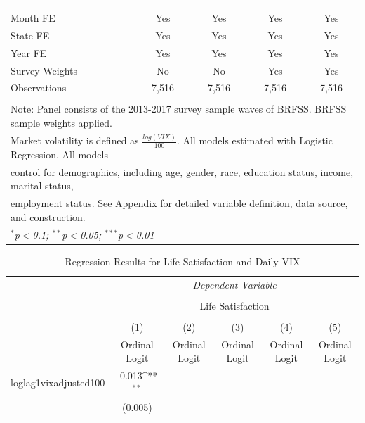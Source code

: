 \documentclass[11pt,a4paper,oldfontcommands]{memoir}
\begin{document}
{\begin{footnotesize}
\begin{footnotesize}
\begin{longtable}{l*{4}{c}}
\hline \\[-1.8ex] 
Month FE  & Yes & Yes & Yes & Yes \\ 
State FE  & Yes & Yes & Yes & Yes \\ 
Year FE  & Yes & Yes & Yes & Yes \\ 
Survey Weights & No & No & Yes & Yes\\ 
Observations  & 7,516 & 7,516 & 7,516 & 7,516 \\ 
\hline \\[-1.8ex] 
\multicolumn{5}{l}{Note: Panel consists of the 2013-2017 survey sample waves of BRFSS. BRFSS sample weights applied.}\\
\multicolumn{5}{l}{Market volatility is defined as $\frac{log(VIX)}{100}$. All models estimated with Logistic Regression. All models}\\
\multicolumn{5}{l}{control for demographics, including age, gender, race, education status, income, marital status,}\\
\multicolumn{5}{l}{employment status. See Appendix for detailed variable definition, data  source, and construction.}\\
\multicolumn{5}{l}{\textit{$^{*}$p$<$0.1; $^{**}$p$<$0.05; $^{***}$p$<$0.01}} \\ 
\hline\hline
\end{longtable}
\end{footnotesize}


\begin{tiny}
\def\sym#1{\ifmmode^{#1}\else\(^{#1}\)\fi}
\begin{longtable}{l*{5}{c}}
\caption{Regression Results for Life-Satisfaction and Daily VIX} \\
\hline\hline
& \multicolumn{5}{c}{ \textit{Dependent Variable}} \\
\cline{2-6}\\[-4ex]
& \multicolumn{5}{c}{Life Satisfaction}\\
\\[-4ex]
                    &\multicolumn{1}{c}{(1)}&\multicolumn{1}{c}{(2)}&\multicolumn{1}{c}{(3)}&\multicolumn{1}{c}{(4)}&\multicolumn{1}{c}{(5)}\\
                    &\multicolumn{1}{c}{Ordinal Logit}&\multicolumn{1}{c}{Ordinal Logit}&\multicolumn{1}{c}{Ordinal Logit}&\multicolumn{1}{c}{Ordinal Logit}&\multicolumn{1}{c}{Ordinal Logit}\\
\hline
loglag1vixadjusted100&      -0.013\sym{**} &                     &                     &                     &                     \\
                    &     (0.005)         &                     &                     &                     &                     \\
 

\end{longtable}
\end{tiny}
\end{footnotesize}}
\end{document}
